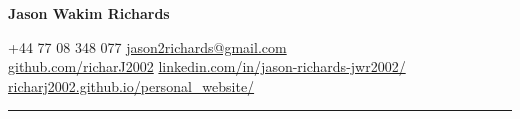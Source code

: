 \documentclass[10pt,a4paper]{article}
\newcommand{\NameSize}{20pt}
\newcommand{\ContactSize}{8pt}
\newcommand{\NameLineSize}{20pt}
\newcommand{\ContactLineSize}{8pt}
\newcommand{\HeaderKeywordToContact}{5pt}
\newcommand{\HeaderAfter}{-5pt}
\newcommand{\StatementBefore}{0pt}
\newcommand{\CVLineThickness}{0.5pt}
\newcommand{\CVLine}{
    \vspace{\HeaderAfter}
    \noindent
    \textcolor{CVBlack}{
        \rule{\textwidth}{\CVLineThickness}
    }
    \vspace{\HeaderAfter}
}
\begin{document}

\begin{center}


    {
        \fontsize{\NameSize}{\NameLineSize}\selectfont
        \textbf{\textcolor{CVBlack}{Jason Wakim Richards}}
    }


    \vspace{\HeaderKeywordToContact}

    {
        \fontsize{\ContactSize}{\ContactLineSize}
        \selectfont
        \textcolor{CVBlack}
        {
            +44 77 08 348 077
            \quad\textbar\quad
            \href{mailto:jason2richards@gmail.com}{jason2richards@gmail.com}
            \\
            \href{https://github.com/richarJ2002}{github.com/richarJ2002}
            \quad\textbar\quad
            \href{https://www.linkedin.com/in/jason-richards-jwr2002/}
            {linkedin.com/in/jason-richards-jwr2002/}
            \quad\textbar\quad
            \href{https://richarj2002.github.io/personal_website/}{richarj2002.github.io/personal\_website/}
        }
    }

\end{center}



\CVLine

\vspace{\StatementBefore}
\end{document}
